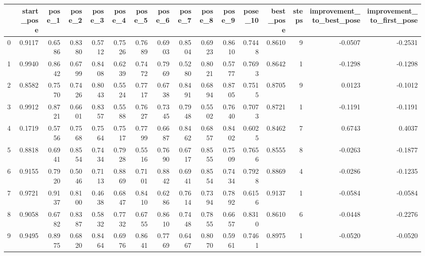 \begin{tabular}{lrrrrrrrrrrrrrrr}
\toprule
{} &  start\_pose &  pose\_1 &  pose\_2 &  pose\_3 &  pose\_4 &  pose\_5 &  pose\_6 &  pose\_7 &  pose\_8 &  pose\_9 &  pose\_10 &  best\_pose &  steps &  improvement\_to\_best\_pose &  improvement\_to\_first\_pose \\
\midrule
0   &      0.9117 &  0.6586 &  0.8380 &  0.5712 &  0.7526 &  0.7689 &  0.6903 &  0.8504 &  0.6923 &  0.8610 &   0.7448 &     0.8610 &      9 &                   -0.0507 &                    -0.2531 \\
1   &      0.9940 &  0.8642 &  0.6799 &  0.8408 &  0.6239 &  0.7472 &  0.7969 &  0.5280 &  0.8021 &  0.5777 &   0.7693 &     0.8642 &      1 &                   -0.1298 &                    -0.1298 \\
2   &      0.8582 &  0.7570 &  0.7426 &  0.8043 &  0.5524 &  0.7717 &  0.6738 &  0.8491 &  0.6894 &  0.8705 &   0.7515 &     0.8705 &      9 &                    0.0123 &                    -0.1012 \\
3   &      0.9912 &  0.8721 &  0.6601 &  0.8357 &  0.5588 &  0.7627 &  0.7345 &  0.7948 &  0.5502 &  0.7640 &   0.7073 &     0.8721 &      1 &                   -0.1191 &                    -0.1191 \\
4   &      0.1719 &  0.5756 &  0.7568 &  0.7564 &  0.7517 &  0.7799 &  0.6687 &  0.8462 &  0.6857 &  0.8402 &   0.6025 &     0.8462 &      7 &                    0.6743 &                     0.4037 \\
5   &      0.8818 &  0.6941 &  0.8554 &  0.7434 &  0.7928 &  0.5516 &  0.7690 &  0.6717 &  0.8555 &  0.7509 &   0.7656 &     0.8555 &      8 &                   -0.0263 &                    -0.1877 \\
6   &      0.9155 &  0.7920 &  0.5046 &  0.7113 &  0.8869 &  0.7101 &  0.8842 &  0.6941 &  0.8554 &  0.7434 &   0.7928 &     0.8869 &      4 &                   -0.0286 &                    -0.1235 \\
7   &      0.9721 &  0.9137 &  0.8100 &  0.4638 &  0.6847 &  0.8410 &  0.6286 &  0.7614 &  0.7394 &  0.7892 &   0.6156 &     0.9137 &      1 &                   -0.0584 &                    -0.0584 \\
8   &      0.9058 &  0.6782 &  0.8387 &  0.5832 &  0.7732 &  0.6755 &  0.8610 &  0.7448 &  0.7855 &  0.6657 &   0.8310 &     0.8610 &      6 &                   -0.0448 &                    -0.2276 \\
9   &      0.9495 &  0.8975 &  0.6820 &  0.8464 &  0.6976 &  0.8641 &  0.7769 &  0.6467 &  0.8070 &  0.5961 &   0.7461 &     0.8975 &      1 &                   -0.0520 &                    -0.0520 \\

\end{tabular}

